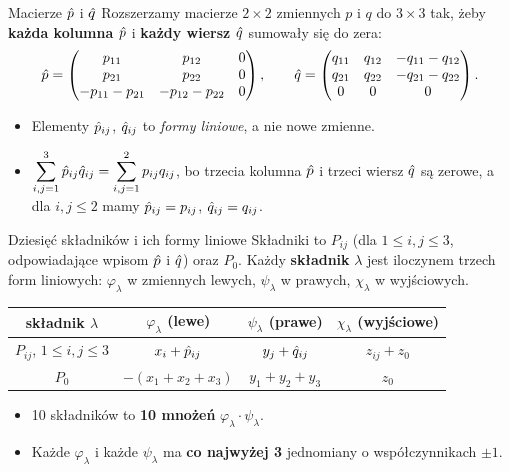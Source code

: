 \begin{frame}{Macierze $\hat p$ i $\hat q$}
  Rozszerzamy macierze $2\times2$ zmiennych $p$ i $q$ do $3\times3$ tak, żeby
  \textbf{każda kolumna $\hat p$} i \textbf{każdy wiersz $\hat q$} sumowały się do zera:
  \[
    \hat p=\begin{pmatrix} p_{11}&p_{12}&0\\ p_{21}&p_{22}&0\\ -p_{11}-p_{21}&-p_{12}-p_{22}&0\end{pmatrix},
    \qquad
    \hat q=\begin{pmatrix} q_{11}&q_{12}&-q_{11}-q_{12}\\ q_{21}&q_{22}&-q_{21}-q_{22}\\ 0&0&0\end{pmatrix}.
  \]
  \pause
  \begin{itemize}
    \item Elementy $\hat p_{ij}$, $\hat q_{ij}$ to \emph{formy liniowe}, a nie nowe zmienne.
    \item $\displaystyle\sum_{i,j=1}^{3}\hat p_{ij}\hat q_{ij}=\sum_{i,j=1}^{2}p_{ij}q_{ij}$, bo trzecia
      kolumna $\hat p$ i trzeci wiersz $\hat q$ są zerowe, a dla $i,j\le2$ mamy $\hat p_{ij}=p_{ij}$, $\hat q_{ij}=q_{ij}$.
  \end{itemize}
\end{frame}

\begin{frame}{Dziesięć składników i ich formy liniowe}
  Składniki to $P_{ij}$ (dla $1\le i,j\le3$, odpowiadające wpisom $\hat p$ i $\hat q$) oraz $P_0$.
  Każdy \textbf{składnik} $\lambda$ jest iloczynem trzech form liniowych:
  $\varphi_\lambda$ w zmiennych lewych, $\psi_\lambda$ w prawych, $\chi_\lambda$ w wyjściowych.
  \vspace{0.4em}
  \begin{center}
    \renewcommand{\arraystretch}{1.4}
    \begin{tabular}{c|c|c|c}
      składnik $\lambda$ & $\varphi_\lambda$ (lewe) & $\psi_\lambda$ (prawe) & $\chi_\lambda$ (wyjściowe)\\\hline
      $P_{ij}$, $1\le i,j\le3$ & $x_i+\hat p_{ij}$ & $y_j+\hat q_{ij}$ & $z_{ij}+z_0$\\
      $P_0$ & $-(x_1+x_2+x_3)$ & $y_1+y_2+y_3$ & $z_0$
    \end{tabular}
  \end{center}
  \pause
  \begin{itemize}
    \item 10 składników to \textbf{10 mnożeń} $\varphi_\lambda\cdot\psi_\lambda$.
    \item Każde $\varphi_\lambda$ i każde $\psi_\lambda$ ma \textbf{co najwyżej 3} jednomiany o współczynnikach $\pm1$.
  \end{itemize}
\end{frame}

